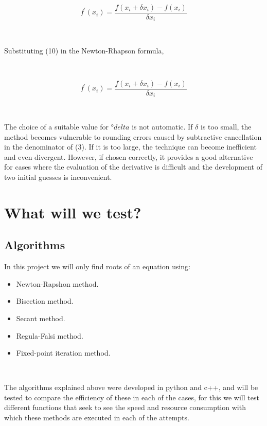 \documentclass[conference]{IEEEtran}
\begin{document}
\

\begin{equation}
f^{'}(x_{i}) = \frac{f(x_{i} + \delta x_{i}) - f(x_{i})}{\delta x_{i}}
\end{equation}

\

Substituting (10) in the Newton-Rhapson formula,


\

\begin{equation}
f^{'}(x_{i}) = \frac{f(x_{i} + \delta x_{i}) - f(x_{i})}{\delta x_{i}}
\end{equation}


\


The choice of a suitable value for $ °delta $ is not automatic. If $ \delta$ is too small, the method becomes vulnerable to rounding errors caused by subtractive cancellation in the denominator of (3). If it is too large, the technique can become inefficient and even divergent. However, if chosen correctly, it provides a good alternative for cases where the evaluation of the derivative is difficult and the development of two initial guesses is inconvenient.
\section{What will we test?}


\subsection{Algorithms}
In this project we will only find roots of an equation using:
\begin{itemize}
    \item Newton-Rapshon method.
    \item Bisection method.
    \item Secant method.
    \item Regula-Falsi method.
    \item Fixed-point iteration method.
\end{itemize}


\

The algorithms explained above were developed in python and c++, and will be tested to compare the efficiency of these in each of the cases, for this we will test different functions that seek to see the speed and resource consumption with which these methods are executed in each of the attempts.

\
\end{document}
